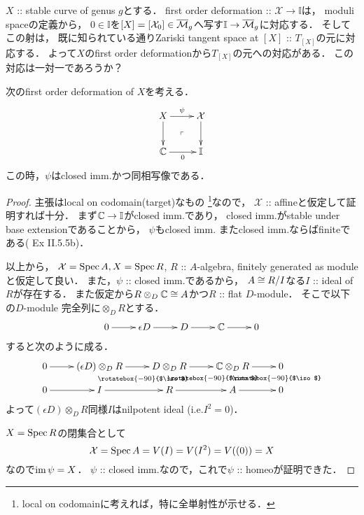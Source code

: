\documentclass[a4paper]{jsarticle}
\newcommand{\dualnum}{\mathbb{I}}
\newcommand{\famX}{\mathcal{X}}
\newcommand{\viso}{\rotatebox{-90}{$\iso$}}
\begin{document}
    \begin{Remark}
        $X$ :: stable curve of genus $g$とする．
        first order deformation :: $\famX \to \dualnum$は，
        moduli spaceの定義から，
        $0 \in \dualnum$を$[X]=[\famX_0] \in \barM_g$へ写す$\dualnum \to \barM_g$に対応する．
        そしてこの射は，
        既に知られている通りZariski tangent space at $[X]$ :: $T_{[X]}$の元に対応する．
        よって$X$のfirst order deformationから$T_{[X]}$の元への対応がある．
        この対応は一対一であろうか？
    \end{Remark}

    \begin{Lemma}\label{lemma:psi_is_imm_homeo}
        次のfirst order deformation of $X$を考える．
        \[\vcenter{\xymatrix{
            X \ar[r]^-{\psi} \ar[d]& \famX \ar[d] \\
            \C \ar[r]_-{0}& \dualnum
            \ar@{}[lu]|{\ulcorner}
        }}\]
        この時，$\psi$はclosed imm.かつ同相写像である．
    \end{Lemma}
    \begin{proof}
        主張はlocal on codomain(target)なもの
        \footnote{ local on codomainに考えれば，特に全単射性が示せる． }なので，
        $\famX$ :: affineと仮定して証明すれば十分．
        まず$\C \to \dualnum$がclosed imm.であり，
        closed imm.がstable under base extensionであることから，
        $\psi$もclosed imm.
        またclosed imm.ならばfiniteである(\cite{HarAG} Ex II.5.5b)．

        以上から，
        $\famX=\Spec A, X=\Spec R$,
        $R$ :: $A$-algebra, finitely generated as module
        と仮定して良い．
        また，$\psi$ :: closed imm.であるから，
        $A \cong R/I$なる$I$ :: ideal of $R$が存在する．
        また仮定から$R \otimes_D \mathbb{C} \cong A$かつ$R$ :: flat $D$-module．
        そこで以下の$D$-module 完全列に$\otimes_D R$とする．
        \[\xymatrix{
            0 \ar[r]& \epsilon D \ar[r]& D \ar[r]& \C \ar[r]& 0
        }\]
        すると次のように成る．
        \[\xymatrix@R=10pt{
            0 \ar[r]& (\epsilon D)\otimes_D R \ar[r]& D \otimes_D R \ar[r]& \C \otimes_D R \ar[r]& 0 \\
            0 \ar[r]& I \ar@<5pt>@{}[u]_-{\viso} \ar[r]& R \ar@<5pt>@{}[u]_-{\viso}\ar[r]& A \ar@<5pt>@{}[u]_-{\viso}\ar[r]& 0 \\
        }\]
        よって$(\epsilon D)\otimes_D R$同様$I$はnilpotent ideal (i.e.$I^2=0$)．

        $X=\operatorname{Spec} R$の閉集合として
        \[ \famX=\Spec A=V(I)=V(I^2)=V((0))=X \]
        なので$\operatorname{im} \psi=X$．
        $\psi$ :: closed imm.なので，これで$\psi$ :: homeoが証明できた．
    \end{proof}
\end{document}
